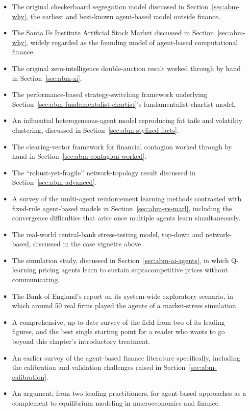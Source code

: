 \documentclass[../ai_in_finance]{subfiles}
\begin{document}

\begin{itemize}
    \item {} The original checkerboard segregation model discussed in Section~\ref{sec:abm-why}, the earliest and best-known agent-based model outside finance.
    \item {} The Santa Fe Institute Artificial Stock Market discussed in Section~\ref{sec:abm-why}, widely regarded as the founding model of agent-based computational finance.
    \item {} The original zero-intelligence double-auction result worked through by hand in Section~\ref{sec:abm-zi}.
    \item {} The performance-based strategy-switching framework underlying Section~\ref{sec:abm-fundamentalist-chartist}'s fundamentalist-chartist model.
    \item {} An influential heterogeneous-agent model reproducing fat tails and volatility clustering, discussed in Section~\ref{sec:abm-stylized-facts}.
    \item {} The clearing-vector framework for financial contagion worked through by hand in Section~\ref{sec:abm-contagion-worked}.
    \item {} The ``robust-yet-fragile'' network-topology result discussed in Section~\ref{sec:abm-advanced}.
    \item {} A survey of the multi-agent reinforcement learning methods contrasted with fixed-rule agent-based models in Section~\ref{sec:abm-vs-marl}, including the convergence difficulties that arise once multiple agents learn simultaneously.
    \item {} The real-world central-bank stress-testing model, top-down and network-based, discussed in the case vignette above.
    \item {} The simulation study, discussed in Section~\ref{sec:abm-ai-agents}, in which Q-learning pricing agents learn to sustain supracompetitive prices without communicating.
    \item {} The Bank of England's report on its system-wide exploratory scenario, in which around 50 real firms played the agents of a market-stress simulation.
    \item {} A comprehensive, up-to-date survey of the field from two of its leading figures, and the best single starting point for a reader who wants to go beyond this chapter's introductory treatment.
    \item {} An earlier survey of the agent-based finance literature specifically, including the calibration and validation challenges raised in Section~\ref{sec:abm-calibration}.
    \item {} An argument, from two leading practitioners, for agent-based approaches as a complement to equilibrium modeling in macroeconomics and finance.
\end{itemize}
\end{document}

